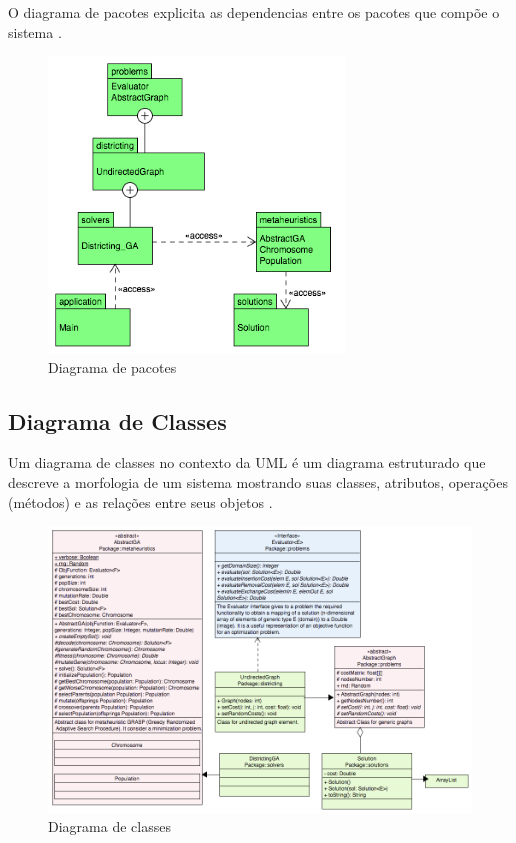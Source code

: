 \documentclass[12pt]{elsarticle}
\begin{document}
O diagrama de pacotes explicita as dependencias entre os pacotes que compõe o sistema \cite{uml}.
    
\begin{figure}[H]
\centering
\includegraphics[width=0.7\textwidth]{UMLPkg.png}
\vspace{0.5cm}
\caption{\label{fig:UMLPkg}Diagrama de pacotes}
\end{figure}
    
    \subsection{Diagrama de Classes}
    
Um diagrama de classes no contexto da UML é um diagrama estruturado que descreve a morfologia de um sistema mostrando suas classes, atributos, operações (métodos) e as relações entre seus objetos \cite{classes}.
    
\begin{figure}[H]
\centering
\includegraphics[width=1.1\textwidth]{UMLCasses.png}
\vspace{0.5cm}
\caption{\label{fig:UMLClasses}Diagrama de classes}
\end{figure}
    
\end{document}
